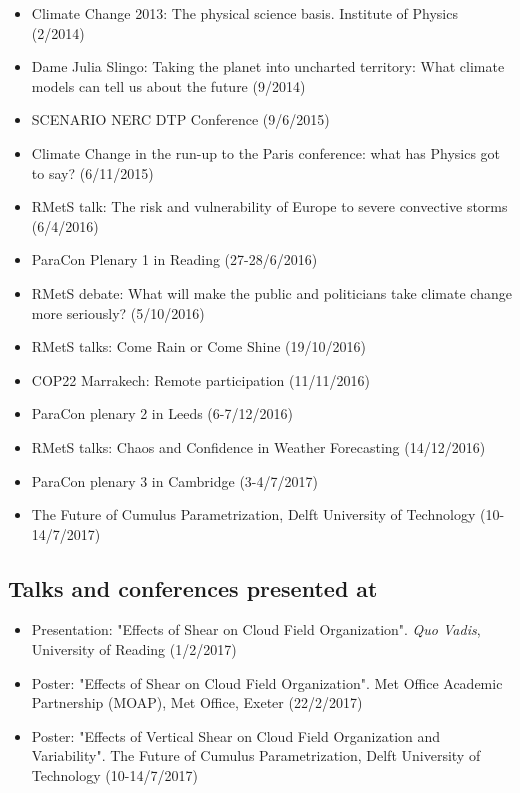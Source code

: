 \documentclass[11pt,a4paper]{article}
\begin{document}
\begin{itemize}
  \item Climate Change 2013: The physical science basis. Institute of Physics (2/2014)
  \item Dame Julia Slingo: Taking the planet into uncharted territory: What climate models can tell us about the future (9/2014)
  \item SCENARIO NERC DTP Conference (9/6/2015)
  \item Climate Change in the run-up to the Paris conference: what has Physics got to say? (6/11/2015)
  \item RMetS talk: The risk and vulnerability of Europe to severe convective storms (6/4/2016)
  \item ParaCon Plenary 1 in Reading (27-28/6/2016)
  \item RMetS debate: What will make the public and politicians take climate change more seriously? (5/10/2016)
  \item RMetS talks: Come Rain or Come Shine (19/10/2016)
  \item COP22 Marrakech: Remote participation (11/11/2016)
  \item ParaCon plenary 2 in Leeds (6-7/12/2016)
  \item RMetS talks: Chaos and Confidence in Weather Forecasting (14/12/2016)
  \item ParaCon plenary 3 in Cambridge (3-4/7/2017)
  \item The Future of Cumulus Parametrization, Delft University of Technology (10-14/7/2017)
\end{itemize}

\subsection*{Talks and conferences presented at}

\begin{itemize}
  \item Presentation: "Effects of Shear on Cloud Field Organization". \textit{Quo Vadis}, University of Reading (1/2/2017)
  \item Poster: "Effects of Shear on Cloud Field Organization". Met Office Academic Partnership (MOAP), Met Office, Exeter (22/2/2017)
  \item Poster: "Effects of Vertical Shear on Cloud Field Organization and Variability". The Future of Cumulus Parametrization, Delft University of Technology (10-14/7/2017)
\end{itemize}
\end{document}
